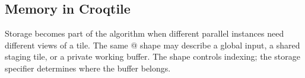\subsection*{Memory in Croqtile}

Storage becomes part of the algorithm when different parallel instances need different views of a tile. The same \co@[M, N]@ shape may describe a global input, a shared staging tile, or a private working buffer. The shape controls indexing; the storage specifier determines where the buffer belongs.
